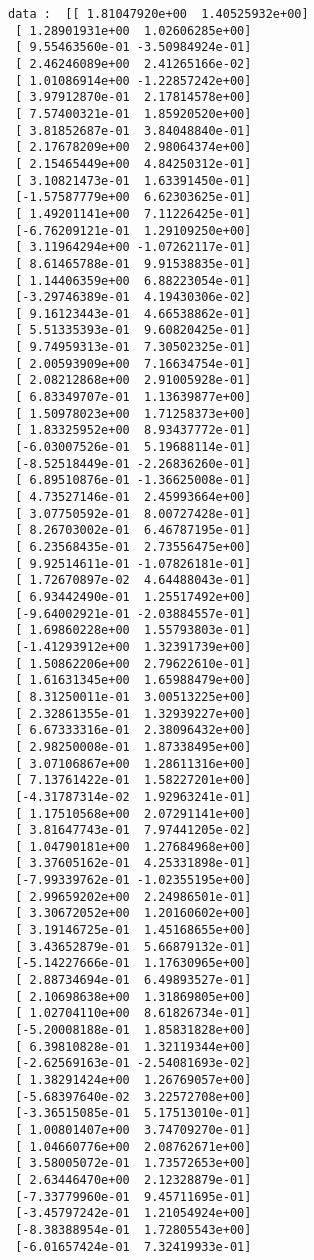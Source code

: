 \documentclass[11pt]{article}
\begin{document}
\begin{Verbatim}[commandchars=\\\{\}]
data :  [[ 1.81047920e+00  1.40525932e+00]
 [ 1.28901931e+00  1.02606285e+00]
 [ 9.55463560e-01 -3.50984924e-01]
 [ 2.46246089e+00  2.41265166e-02]
 [ 1.01086914e+00 -1.22857242e+00]
 [ 3.97912870e-01  2.17814578e+00]
 [ 7.57400321e-01  1.85920520e+00]
 [ 3.81852687e-01  3.84048840e-01]
 [ 2.17678209e+00  2.98064374e+00]
 [ 2.15465449e+00  4.84250312e-01]
 [ 3.10821473e-01  1.63391450e-01]
 [-1.57587779e+00  6.62303625e-01]
 [ 1.49201141e+00  7.11226425e-01]
 [-6.76209121e-01  1.29109250e+00]
 [ 3.11964294e+00 -1.07262117e-01]
 [ 8.61465788e-01  9.91538835e-01]
 [ 1.14406359e+00  6.88223054e-01]
 [-3.29746389e-01  4.19430306e-02]
 [ 9.16123443e-01  4.66538862e-01]
 [ 5.51335393e-01  9.60820425e-01]
 [ 9.74959313e-01  7.30502325e-01]
 [ 2.00593909e+00  7.16634754e-01]
 [ 2.08212868e+00  2.91005928e-01]
 [ 6.83349707e-01  1.13639877e+00]
 [ 1.50978023e+00  1.71258373e+00]
 [ 1.83325952e+00  8.93437772e-01]
 [-6.03007526e-01  5.19688114e-01]
 [-8.52518449e-01 -2.26836260e-01]
 [ 6.89510876e-01 -1.36625008e-01]
 [ 4.73527146e-01  2.45993664e+00]
 [ 3.07750592e-01  8.00727428e-01]
 [ 8.26703002e-01  6.46787195e-01]
 [ 6.23568435e-01  2.73556475e+00]
 [ 9.92514611e-01 -1.07826181e-01]
 [ 1.72670897e-02  4.64488043e-01]
 [ 6.93442490e-01  1.25517492e+00]
 [-9.64002921e-01 -2.03884557e-01]
 [ 1.69860228e+00  1.55793803e-01]
 [-1.41293912e+00  1.32391739e+00]
 [ 1.50862206e+00  2.79622610e-01]
 [ 1.61631345e+00  1.65988479e+00]
 [ 8.31250011e-01  3.00513225e+00]
 [ 2.32861355e-01  1.32939227e+00]
 [ 6.67333316e-01  2.38096432e+00]
 [ 2.98250008e-01  1.87338495e+00]
 [ 3.07106867e+00  1.28611316e+00]
 [ 7.13761422e-01  1.58227201e+00]
 [-4.31787314e-02  1.92963241e-01]
 [ 1.17510568e+00  2.07291141e+00]
 [ 3.81647743e-01  7.97441205e-02]
 [ 1.04790181e+00  1.27684968e+00]
 [ 3.37605162e-01  4.25331898e-01]
 [-7.99339762e-01 -1.02355195e+00]
 [ 2.99659202e+00  2.24986501e-01]
 [ 3.30672052e+00  1.20160602e+00]
 [ 3.19146725e-01  1.45168655e+00]
 [ 3.43652879e-01  5.66879132e-01]
 [-5.14227666e-01  1.17630965e+00]
 [ 2.88734694e-01  6.49893527e-01]
 [ 2.10698638e+00  1.31869805e+00]
 [ 1.02704110e+00  8.61826734e-01]
 [-5.20008188e-01  1.85831828e+00]
 [ 6.39810828e-01  1.32119344e+00]
 [-2.62569163e-01 -2.54081693e-02]
 [ 1.38291424e+00  1.26769057e+00]
 [-5.68397640e-02  3.22572708e+00]
 [-3.36515085e-01  5.17513010e-01]
 [ 1.00801407e+00  3.74709270e-01]
 [ 1.04660776e+00  2.08762671e+00]
 [ 3.58005072e-01  1.73572653e+00]
 [ 2.63446470e+00  2.12328879e-01]
 [-7.33779960e-01  9.45711695e-01]
 [-3.45797242e-01  1.21054924e+00]
 [-8.38388954e-01  1.72805543e+00]
 [-6.01657424e-01  7.32419933e-01]

\end{Verbatim}
\end{document}
